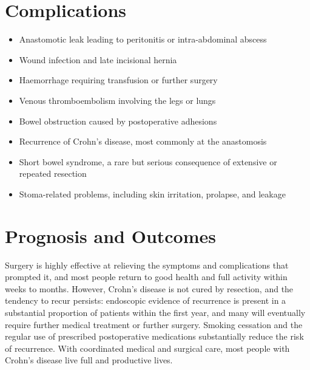 \section*{Complications}
\begin{itemize}
    \item Anastomotic leak leading to peritonitis or intra-abdominal abscess
    \item Wound infection and late incisional hernia
    \item Haemorrhage requiring transfusion or further surgery
    \item Venous thromboembolism involving the legs or lungs
    \item Bowel obstruction caused by postoperative adhesions
    \item Recurrence of Crohn's disease, most commonly at the anastomosis
    \item Short bowel syndrome, a rare but serious consequence of extensive or repeated resection
    \item Stoma-related problems, including skin irritation, prolapse, and leakage
\end{itemize}

\section*{Prognosis and Outcomes}
Surgery is highly effective at relieving the symptoms and complications that prompted it, and most people return to good health and full activity within weeks to months. However, Crohn's disease is not cured by resection, and the tendency to recur persists: endoscopic evidence of recurrence is present in a substantial proportion of patients within the first year, and many will eventually require further medical treatment or further surgery. Smoking cessation and the regular use of prescribed postoperative medications substantially reduce the risk of recurrence. With coordinated medical and surgical care, most people with Crohn's disease live full and productive lives.


